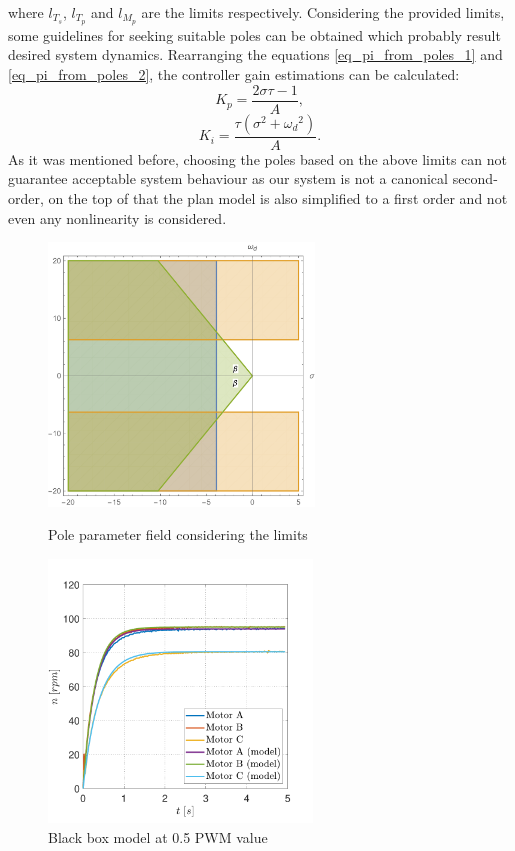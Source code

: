 \documentclass[12pt,english]{article}
\begin{document}
where $l_{T_s}$, $l_{T_p}$ and $l_{M_p}$ are the limits respectively.
Considering the provided limits, some guidelines for seeking suitable poles can be obtained which probably result desired system dynamics. Rearranging the equations \ref{eq_pi_from_poles_1} and \ref{eq_pi_from_poles_2}, the controller gain estimations can be calculated:
\begin{equation}
K_p = \frac{2 \sigma \tau - 1}{A},
\end{equation}
\begin{equation}
K_i = \frac{\tau(\sigma^2 + {\omega_d}^2)}{A}.
\end{equation}
As it was mentioned before, choosing the poles based on the above limits can not guarantee acceptable system behaviour as our system is not a canonical second-order, on the top of that the plan model is also simplified to a first order and not even any nonlinearity is considered.
\begin{figure}[htb!]
	\centering
	\centering
	\includegraphics[height=7cm]{figures/possible_poles}
	\caption{Pole parameter field considering the limits}
	\label{possible_poles}
	\endminipage\hfill
	\centering
	\includegraphics[height=7cm]{figures/directed_speed_pwm_50_fitted}
	\caption{Black box model at 0.5 PWM value}
	\label{fitted_model}
	\endminipage\hfill
\end{figure}
\end{document}
